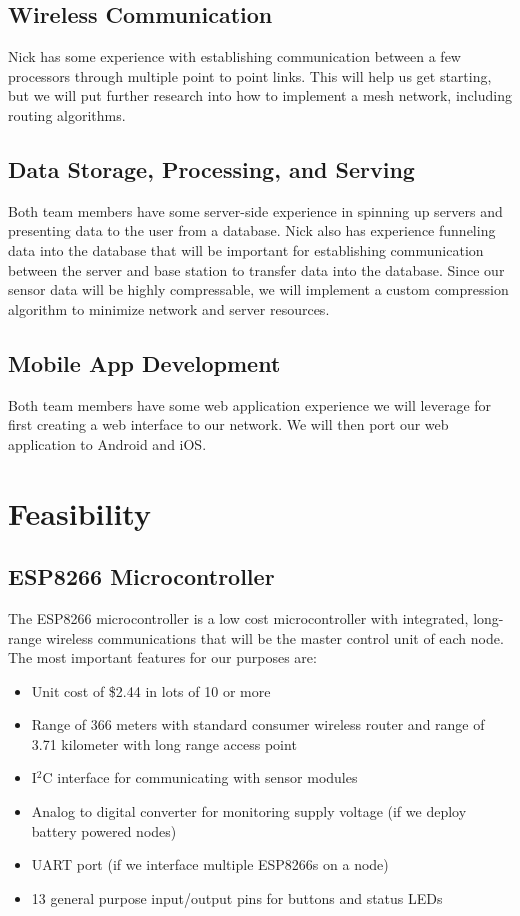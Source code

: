 		\subsection{Wireless Communication}
			Nick has some experience with establishing communication between a few processors through multiple point to point links. This will help us get starting, but we will put further research into how to implement a mesh network, including routing algorithms.
		
		\subsection{Data Storage, Processing, and Serving}
			Both team members have some server-side experience in spinning up servers and presenting data to the user from a database. Nick also has experience funneling data into the database that will be important for establishing communication between the server and base station to transfer data into the database. Since our sensor data will be highly compressable, we will implement a custom compression algorithm to minimize network and server resources.
			
		\subsection{Mobile App Development}
			Both team members have some web application experience we will leverage for first creating a web interface to our network. We will then port our web application to Android and iOS.
 
	 \section{Feasibility}
		 \subsection{ESP8266 Microcontroller}
			 The ESP8266 microcontroller is a low cost microcontroller with integrated, long-range wireless communications that will be the master control unit of each node. The most important features for our purposes are:
			 \begin{itemize}
			 	\item Unit cost of \$2.44 in lots of 10 or more
			 	\item Range of 366 meters with standard consumer wireless router and range of 3.71 kilometer with long range access point
			 	\item I$^2$C interface for communicating with sensor modules
			 	\item Analog to digital converter for monitoring supply voltage (if we deploy battery powered nodes)
			 	\item UART port (if we interface multiple ESP8266s on a node)
			 	\item 13 general purpose input/output pins for buttons and status LEDs
			 \end{itemize}
			 
